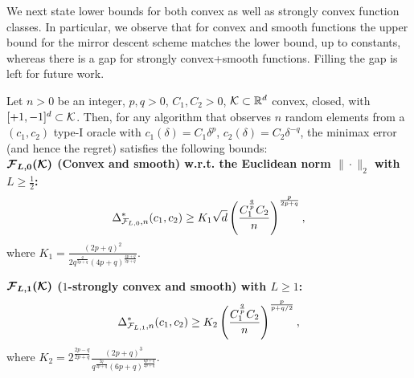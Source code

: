 We next state lower bounds for both convex as well as strongly convex function classes. In particular, we observe that for convex and smooth functions the upper bound for the mirror descent scheme matches the lower bound, up to constants, whereas there is a gap for strongly convex+smooth functions.
Filling the gap is left for future work.
\begin{theorem}
\label{thm:lb-convex}
Let $n>0$ be an integer, $p,q>0$, $C_1,C_2>0$, 
$\mathcal{K}\subset \mathbb{R}^d$ convex, closed, with  $[+1,-1]^d\subset \mathcal{K}$.
Then, for any algorithm that observes $n$ random elements from a $(c_1,c_2)$ type-I oracle 
 with $c_1(\delta) = C_1 \delta^p$, $c_2(\delta) = C_2 \delta^{-q}$,
 the minimax error (and hence the regret) satisfies the following bounds:\\
\textbf{$\bm{\mathcal{F}_{L,0}(\mathcal{K})}$ (Convex and smooth) w.r.t. the Euclidean norm $\|\cdot\|_2$ with $L\ge \frac12$:}
\[
 \Delta_{\mathcal{F}_{L,0},n}^{*}(c_1,c_2) \ge K_1\sqrt{d}\left(\dfrac{C_1^{\frac{q}{p}}C_2}{n}\right)^{\frac{p}{2p+q}},
\]
where $K_1 = \frac{\left(2p+q\right)^2}{2q^{\frac{q}{2p+q}}\left(4p+q\right)^{\frac{4p+q}{2p+q}}}$.

\textbf{$\bm{\mathcal{F}_{L,1}(\mathcal{K})}$ ($1$-strongly convex and smooth) with $L\ge 1$:}
\[
\Delta_{\mathcal{F}_{L,1}, n}^{*}(c_1,c_2) \ge K_2 \left(\dfrac{C_1^{\frac{q}{p}} C_2}{n} \right)^{\frac{p}{p+q/2}}, 
\]
where $K_2 = 2^{\frac{2p-q}{2p+q}} \frac{(2p+q)^3}{q^{\frac{2q}{2p+q}}(6p+q)^{\frac{6p+q}{2p+q}}} $.
\end{theorem}
